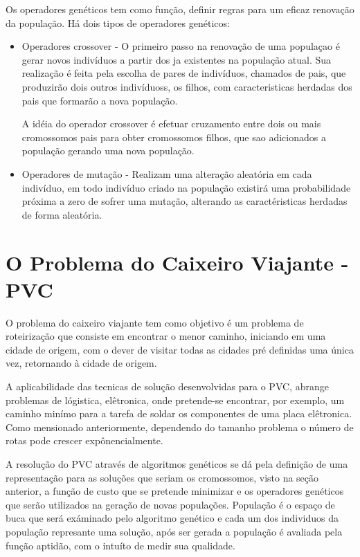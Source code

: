 \documentclass[
	12pt,				%
	openright,			%
	twoside,			%
	a4paper,			%
	chapter=TITLE,		%
	section=TITLE,		%
	english,			%
	french,				%
	spanish,			%
	brazil				%
	]{abntex2}
\begin{document}
Os operadores genéticos tem como função, definir regras para um eficaz renovação da população. Há dois tipos de operadores genéticos:
\begin{itemize}
\item Operadores crossover - O primeiro passo na renovação de uma populaçao é gerar novos indivíduos a partir dos ja existentes na população atual. Sua realização é feita pela escolha de pares de indivíduos, chamados de pais, que produzirão dois outros indivíduoss, os filhos, com caracteristicas herdadas dos pais que formarão a nova população.

A idéia do operador crossover é efetuar cruzamento entre dois ou mais cromossomos pais para obter cromossomos filhos, que sao adicionados a população gerando uma nova população.

\item Operadores de mutação - Realizam uma alteração aleatória em cada indivíduo, em todo indivíduo criado na população existirá uma probabilidade próxima a zero de sofrer uma mutação, alterando as caractéristicas herdadas de forma aleatória.
\end{itemize}

\section{O Problema do Caixeiro Viajante - PVC}
O problema do caixeiro viajante tem como objetivo é um problema de roteirização que consiste em encontrar o menor caminho, iniciando em uma cidade de origem, com o dever de visitar todas as cidades pré definidas uma única vez, retornando à cidade de origem.

A aplicabilidade das tecnicas de solução desenvolvidas para o PVC, abrange problemas de lógistica, elêtronica, onde pretende-se encontrar, por exemplo, um caminho minímo para a tarefa de soldar os componentes de uma placa elêtronica. Como mensionado anteriormente, dependendo do tamanho problema o número de rotas pode crescer expônencialmente. 

A resolução do PVC através de algoritmos genéticos se dá pela definição de uma representação para as soluções que seriam os cromossomos, visto na seção anterior, a função de custo que se pretende minimizar e os operadores genéticos que serão utilizados na geração de novas populações. População é o espaço de buca que será exáminado pelo algoritmo genético e cada um dos individuos da população represante uma solução, após ser gerada a população é avaliada pela função aptidão, com o intuíto de medir sua qualidade.
\end{document}
